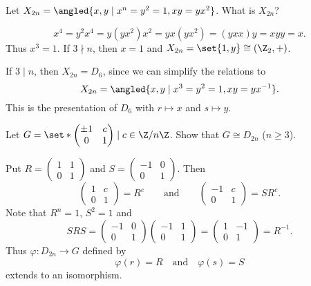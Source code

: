 \documentclass[12pt]{article}
\begin{document}
\begin{problem}
    Let $X_{2n} = \angled{x, y \mid x^n = y^2 = 1, xy = yx^2}$.
    What is $X_{2n}$?
\end{problem}
\begin{solution}
    \[
        x^4 = y^2 x^4 = y(yx^2)x^2 = yx(yx^2) = (yx x)y = xyy = x.
    \] Thus $x^3 = 1$.
    If $3 \nmid n$, then $x = 1$ and $X_{2n} = \set{1, y} \cong (\Z_2, +)$.

    If $3 \mid n$, then $X_{2n} = D_6$, since we can simplify the
    relations to \[
        X_{2n} = \angled{x, y \mid x^3 = y^2 = 1, xy = yx^{-1}}.
    \] This is the presentation of $D_6$ with
    $r \mapsto x$ and $s \mapsto y$.
\end{solution}

\begin{problem}
    Let $G = \set*{\begin{pmatrix}
        \pm 1 & c \\
        0 & 1
    \end{pmatrix} \mid c \in \Z/n\Z}$.
    Show that $G \cong D_{2n}$ ($n \ge 3$).
\end{problem}
\begin{solution}
    Put $R = \begin{pmatrix}
        1 & 1 \\
        0 & 1
    \end{pmatrix}$ and $S = \begin{pmatrix}
        -1 & 0 \\
        0 & 1
    \end{pmatrix}$.
    Then \[
        \begin{pmatrix}
            1 & c \\
            0 & 1
        \end{pmatrix} = R^c
        \qquad \text{and} \qquad
        \begin{pmatrix}
            -1 & c \\
            0 & 1
        \end{pmatrix} = S R^c.
    \] Note that $R^n = 1$, $S^2 = 1$ and \[
        SRS = \begin{pmatrix}
            -1 & 0 \\
            0 & 1
        \end{pmatrix} \begin{pmatrix}
            -1 & 1 \\
            0 & 1
        \end{pmatrix}
        = \begin{pmatrix}
            1 & -1 \\
            0 & 1
        \end{pmatrix}
        = R^{-1}.
    \] Thus $\varphi\colon D_{2n} \to G$ defined by \[
        \varphi(r) = R \quad \text{and} \quad \varphi(s) = S
    \] extends to an isomorphism.
\end{solution}
\end{document}
